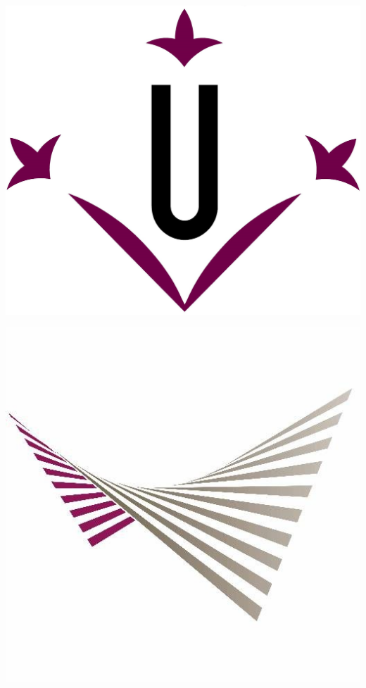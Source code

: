 \documentclass[10pt]{article}
\begin{document}
\thispagestyle{empty}

\begin{center}                                                                      %
\newcommand{\HRule}{\rule{\linewidth}{0.5mm}}                                   %
\begin{minipage}{0.48\textwidth} \begin{flushleft}
\includegraphics[scale = 0.23]{Images/logo_udl.jpg}
\end{flushleft}\end{minipage}
\begin{minipage}{0.48\textwidth} \begin{flushright}
\includegraphics[scale = 0.25]{Images/logo_eps.jpg}

\end{flushright}
\end{minipage}
\end{center}
\end{document}
